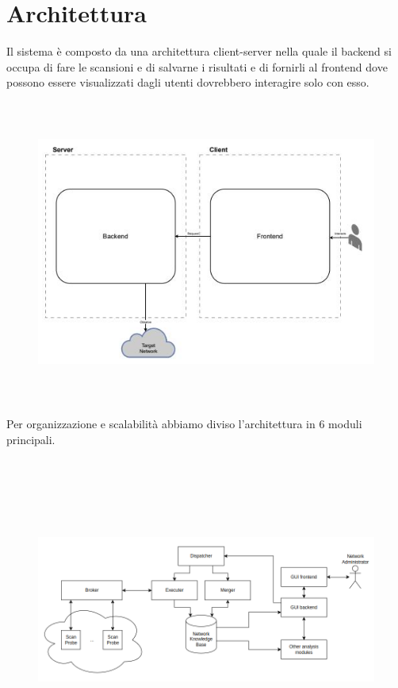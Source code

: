 \documentclass[target=bach,aauheader=,style=]{thud}
\begin{document}
\section{Architettura}
Il sistema è composto da una architettura client-server nella quale il backend si occupa di fare le scansioni e di salvarne i risultati e di fornirli al frontend dove possono essere visualizzati dagli utenti dovrebbero interagire solo con esso. 

\begin{figure}[h]
\includegraphics[width=15cm, height=10cm]{client_server}
\centering
\end{figure}

Per organizzazione e scalabilità abbiamo diviso l'architettura in 6 moduli principali.

\begin{figure}[h]
\includegraphics[width=15cm, height=10cm]{moduli_new}
\centering
\end{figure}
\end{document}
